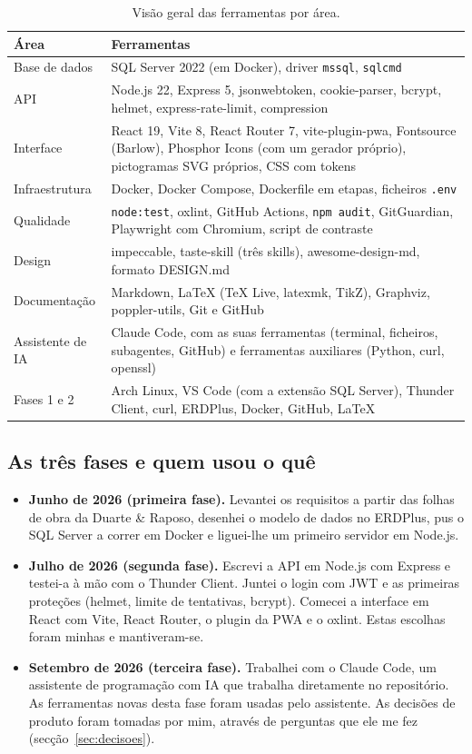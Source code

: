 \documentclass[a4paper,12pt]{article}
\begin{document}
\begin{table}[htbp]
\centering
\small
\begin{tabularx}{\textwidth}{@{}p{3.3cm}L@{}}
\toprule
\textbf{Área} & \textbf{Ferramentas} \\
\midrule
Base de dados & SQL Server 2022 (em Docker), driver \texttt{mssql}, \texttt{sqlcmd} \\
API & Node.js 22, Express 5, jsonwebtoken, cookie-parser, bcrypt, helmet, express-rate-limit, compression \\
Interface & React 19, Vite 8, React Router 7, vite-plugin-pwa, Fontsource (Barlow), Phosphor Icons (com um gerador próprio), pictogramas SVG próprios, CSS com tokens \\
Infraestrutura & Docker, Docker Compose, Dockerfile em etapas, ficheiros \texttt{.env} \\
Qualidade & \texttt{node:test}, oxlint, GitHub Actions, \texttt{npm audit}, GitGuardian, Playwright com Chromium, script de contraste \\
Design & impeccable, taste-skill (três skills), awesome-design-md, formato DESIGN.md \\
Documentação & Markdown, LaTeX (TeX Live, latexmk, TikZ), Graphviz, poppler-utils, Git e GitHub \\
Assistente de IA & Claude Code, com as suas ferramentas (terminal, ficheiros, subagentes, GitHub) e ferramentas auxiliares (Python, curl, openssl) \\
Fases 1 e 2 & Arch Linux, VS Code (com a extensão SQL Server), Thunder Client, curl, ERDPlus, Docker, GitHub, LaTeX \\
\bottomrule
\end{tabularx}
\caption{Visão geral das ferramentas por área.}
\label{tab:visao}
\end{table}

\subsection{As três fases e quem usou o quê}

\begin{itemize}
  \item \textbf{Junho de 2026 (primeira fase).} Levantei os requisitos a partir das folhas de obra da Duarte \& Raposo, desenhei o modelo de dados no ERDPlus, pus o SQL Server a correr em Docker e liguei-lhe um primeiro servidor em Node.js.
  \item \textbf{Julho de 2026 (segunda fase).} Escrevi a API em Node.js com Express e testei-a à mão com o Thunder Client. Juntei o login com JWT e as primeiras proteções (helmet, limite de tentativas, bcrypt). Comecei a interface em React com Vite, React Router, o plugin da PWA e o oxlint. Estas escolhas foram minhas e mantiveram-se.
  \item \textbf{Setembro de 2026 (terceira fase).} Trabalhei com o Claude Code, um assistente de programação com IA que trabalha diretamente no repositório. As ferramentas novas desta fase foram usadas pelo assistente. As decisões de produto foram tomadas por mim, através de perguntas que ele me fez (secção~\ref{sec:decisoes}).
\end{itemize}
\end{document}
